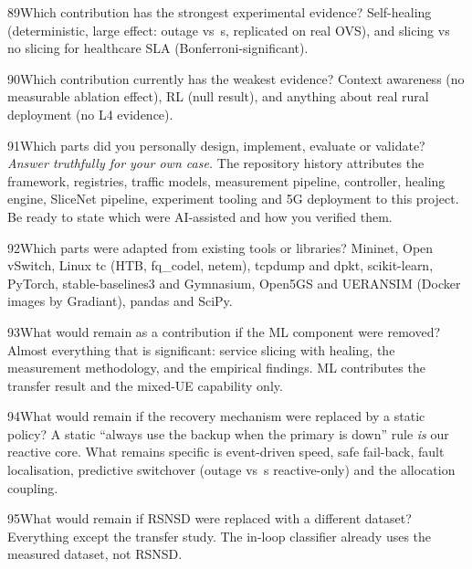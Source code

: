 \begin{qa}{89}{Which contribution has the strongest experimental evidence?}
Self-healing (deterministic, large effect: outage \NOutCutFullMean{} vs \NOutCutNoneMean\,s, replicated on real OVS),
and slicing vs no slicing for healthcare SLA (Bonferroni-significant).
\end{qa}

\begin{qa}{90}{Which contribution currently has the weakest evidence?}
Context awareness (no measurable ablation effect), RL (null result), and anything about real rural
deployment (no L4 evidence).
\end{qa}

\begin{qa}{91}{Which parts did you personally design, implement, evaluate or validate?}
\textit{Answer truthfully for your own case.} The repository history attributes the framework, registries, traffic
models, measurement pipeline, controller, healing engine, SliceNet pipeline, experiment tooling and 5G deployment to
this project. Be ready to state which were AI-assisted and how you verified them.
\end{qa}

\begin{qa}{92}{Which parts were adapted from existing tools or libraries?}
Mininet, Open vSwitch, Linux tc (HTB, fq\_codel, netem), tcpdump and dpkt, scikit-learn, PyTorch, stable-baselines3 and
Gymnasium, Open5GS and UERANSIM (Docker images by Gradiant), pandas and SciPy.
\end{qa}

\begin{qa}{93}{What would remain as a contribution if the ML component were removed?}
Almost everything that is significant: service slicing with healing, the measurement methodology, and the
empirical findings. ML contributes the transfer result and the mixed-UE capability only.
\end{qa}

\begin{qa}{94}{What would remain if the recovery mechanism were replaced by a static policy?}
A static ``always use the backup when the primary is down'' rule \emph{is} our reactive core. What remains specific is
event-driven speed, safe fail-back, fault localisation, predictive switchover (outage \NOutDegFullMean{} vs
\NOutDegReactiveMean\,s reactive-only) and the allocation coupling.
\end{qa}

\begin{qa}{95}{What would remain if RSNSD were replaced with a different dataset?}
Everything except the transfer study. The in-loop classifier already uses the measured dataset, not RSNSD.
\end{qa}


